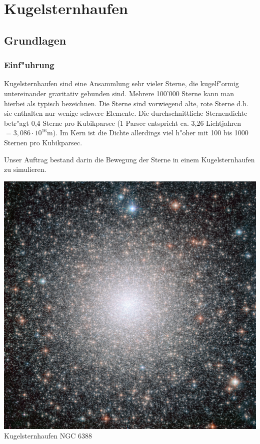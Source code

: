 \chapter{Kugelsternhaufen}
\begin{refsection}

\section{Grundlagen}

\subsection{Einf"uhrung}
\begin{minipage}{.65\textwidth}
Kugelsternhaufen sind eine Ansammlung sehr vieler Sterne, die kugelf"ormig
untereinander gravitativ gebunden sind. Mehrere 100'000 Sterne kann
man hierbei als typisch bezeichnen. Die Sterne sind vorwiegend alte,
rote Sterne d.h. sie enthalten nur wenige schwere Elemente. Die
durchschnittliche Sternendichte betr"agt 0,4 Sterne pro Kubikparsec (1
Parsec entspricht ca. 3,26 Lichtjahren $\mathrm{= 3,086 \cdot 10^{16}
m}$). Im Kern ist die Dichte allerdings viel h"oher mit 100 bis 1000
Sternen pro Kubikparsec.

Unser Auftrag bestand darin die Bewegung der Sterne in einem
Kugelsternhaufen zu simulieren. \cite{kugel:wiki:grundlagen}
\end{minipage}
\hspace{.5cm}
\begin{minipage}{.3\textwidth}
\begin{center}
	\includegraphics[width = \textwidth]{kugel/images/Abbildung1_1.jpg}
	Kugelsternhaufen NGC 6388 \cite{kugel:titelbild}
\end{center}
\end{minipage}


\end{refsection}
